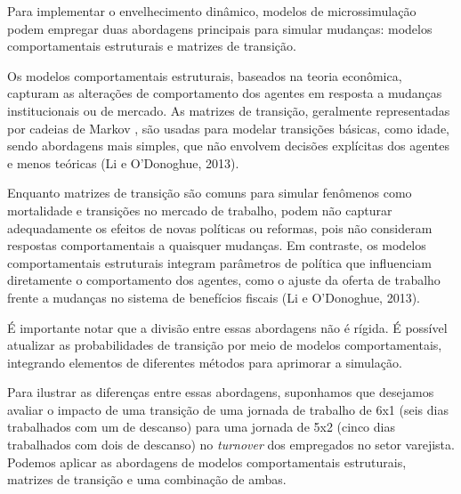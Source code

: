 \documentclass[12pt]{article}
\theoremstyle{break}
\begin{document}
Para implementar o envelhecimento dinâmico, modelos de microssimulação podem empregar duas abordagens principais para simular mudanças: modelos comportamentais estruturais e matrizes de transição.

Os modelos comportamentais estruturais, baseados na teoria econômica, capturam as alterações de comportamento dos agentes em resposta a mudanças institucionais ou de mercado. As matrizes de transição, geralmente representadas por cadeias de Markov , são usadas para modelar transições básicas, como idade, sendo abordagens mais simples, que não envolvem decisões explícitas dos agentes e menos teóricas (Li e O'Donoghue, 2013).

Enquanto matrizes de transição são comuns para simular fenômenos como mortalidade e transições no mercado de trabalho, podem não capturar adequadamente os efeitos de novas políticas ou reformas, pois não consideram respostas comportamentais a quaisquer mudanças. Em contraste, os modelos comportamentais estruturais integram parâmetros de política que influenciam diretamente o comportamento dos agentes, como o ajuste da oferta de trabalho frente a mudanças no sistema de benefícios fiscais (Li e O'Donoghue, 2013).

É importante notar que a divisão entre essas abordagens não é rígida. É possível atualizar as probabilidades de transição por meio de modelos comportamentais, integrando elementos de diferentes métodos para aprimorar a simulação.

Para ilustrar as diferenças entre essas abordagens, suponhamos que desejamos avaliar o impacto de uma transição de uma jornada de trabalho de 6x1 (seis dias trabalhados com um de descanso) para uma jornada de 5x2 (cinco dias trabalhados com dois de descanso) no \textit{turnover} dos empregados no setor varejista. Podemos aplicar as abordagens de modelos comportamentais estruturais, matrizes de transição e uma combinação de ambas.
\end{document}

